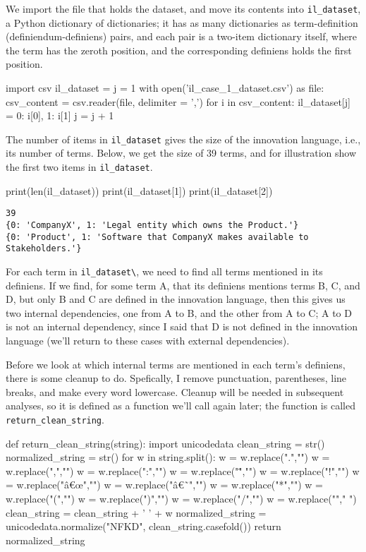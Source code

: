 We import the file that holds the dataset, and move its contents into \verb|il_dataset|, a Python dictionary of dictionaries; it has as many dictionaries as term-definition (definiendum-definiens) pairs, and each pair is a two-item dictionary itself, where the term has the zeroth position, and the corresponding definiens holds the first position.

\begin{pycode}
import csv
il_dataset = {}
j = 1
with open('il_case_1_dataset.csv') as file:
    csv_content = csv.reader(file, delimiter = ',')
    for i in csv_content:
        il_dataset[j] = { 0: i[0], 1: i[1] }
        j = j + 1
\end{pycode}

The number of items in \verb|il_dataset| gives the size of the innovation language, i.e., its number of terms. Below, we get the size of 39 terms, and for illustration show the first two items in \verb|il_dataset|.

\begin{pycode}
print(len(il_dataset))
print(il_dataset[1])
print(il_dataset[2])
\end{pycode}

\begin{lstlisting}[breaklines]
39
{0: 'CompanyX', 1: 'Legal entity which owns the Product.'}
{0: 'Product', 1: 'Software that CompanyX makes available to Stakeholders.'}
\end{lstlisting}

For each term in \verb|il_dataset\|, we need to find all terms mentioned in its definiens. If we find, for some term A, that its definiens mentions terms B, C, and D, but only B and C are defined in the innovation language, then this gives us two internal dependencies, one from A to B, and the other from A to C; A to D is not an internal dependency, since I said that D is not defined in the innovation language (we'll return to these cases with external dependencies).

Before we look at which internal terms are mentioned in each term's definiens, there is some cleanup to do. Spefically, I remove punctuation, parentheses, line breaks, and make every word lowercase. Cleanup will be needed in subsequent analyses, so it is defined as a function we'll call again later; the function is called \verb|return_clean_string|.

\begin{pycode}
def return_clean_string(string):
    import unicodedata
    clean_string = str()
    normalized_string = str()
    for w in string.split():
        w = w.replace(".","")
        w = w.replace(",","")
        w = w.replace(":","")
        w = w.replace("\"","")
        w = w.replace("!","")
        w = w.replace("â€œ","")
        w = w.replace("â€˜","")
        w = w.replace("*","")
        w = w.replace("(","")
        w = w.replace(")","")
        w = w.replace("/","")
        w = w.replace("\n"," ")
        clean_string = clean_string + ' ' + w
    normalized_string = unicodedata.normalize("NFKD", clean_string.casefold())
    return normalized_string
\end{pycode}

